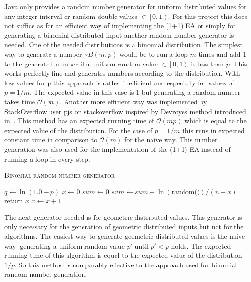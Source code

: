 Java only provides a random number generator for uniform distributed values for any integer interval or random double values $\in \left[0, 1\right)$.
For this project this does not suffice as for an efficient way of implementing the (1+1) EA or simply for generating a binomial distributed input another random number generator is needed.
One of the needed distributions is a binomial distribution.
The simplest way to generate a number \textasciitilde$B(m,p)$ would be to run a loop $m$ times and add 1 to the generated number if a uniform random value $\in \left[0, 1\right)$ is less than $p$.
This works perfectly fine and generates numbers according to the distribution.
With low values for p this approach is rather inefficient and especially for values of $p=1/m$.
The expected value in this case is 1 but generating a random number takes time $\mathcal{O}(m)$.
Another more efficient way was implemented by StackOverflow user \href{https://stackoverflow.com/users/2166798/pjs}{pjs} on \href{https://stackoverflow.com/questions/23561551/a-efficient-binomial-random-number-generator-code-in-java}{stackoverflow} inspired by Devroyes method introduced in~\cite{devroye2006nonuniform}.
This method has an expected running time of $\mathcal{O}(mp)$ which is equal to the expected value of the distribution.
For the case of $p=1/m$ this runs in expected constant time in comparison to $\mathcal{O}(m)$ for the naive way.
This number generation was also used for the implementation of the (1+1) EA instead of running a loop in every step.

\begin{algorithm}[h]
      \caption{\textsc{Binomial random number generator}}\label{alg:binomialRNG}

      \DontPrintSemicolon %
      $q \leftarrow \ln(1.0 - p)$\;
      $x \leftarrow 0$\;
      $sum \leftarrow 0$\;
      {
      $sum \leftarrow sum +\ln(\text{random()}) / (n - x)$\; \tcp{random() generates a random value $\in \left[0, 1\right)$}
      {
            return $x$\;
      }
      $x \leftarrow x + 1$\;
      }
\end{algorithm}

The next generator needed is for geometric distributed values.
This generator is only necessary for the generation of geometric distributed inputs but not for the algorithms.
The easiest way to generate geometric distributed values is the naive way:
generating a uniform random value $p'$ until $p'<p$ holds.
The expected running time of this algorithm is equal to the expected value of the distribution $1/p$.
So this method is comparably effective to the approach used for binomial random number generation.

